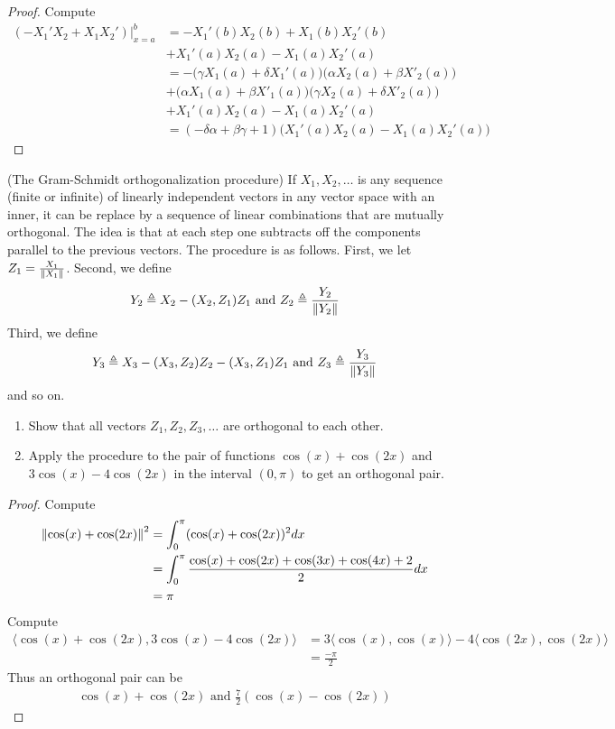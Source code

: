 \documentclass{report}
\begin{document}
\begin{proof}
Compute 
\begin{align*}
(-X_1'X_2+ X_1X_2')\Big|_{x=a}^b&= -X_1'(b)X_2(b)+X_1 (b)X_2'(b) \\
&+X_1'(a)X_2(a)-X_1(a)X_2'(a)\\
&= - \Big(\gamma X_1(a)+\delta X_1'(a) \Big)\Big( \alpha X_2(a) + \beta X'_2(a) \Big)\\
&+ \Big(\alpha X_1(a)+ \beta X'_1(a) \Big) \Big( \gamma X_2(a)+\delta X'_2(a) \Big)\\
&+X_1'(a)X_2(a)-X_1(a)X_2'(a)\\
&= (-\delta \alpha + \beta  \gamma +1)\big(X_1'(a)X_2(a)-X_1(a)X_2'(a)\big)
\end{align*}
\end{proof}
\begin{question}{}{}
  (The Gram-Schmidt orthogonalization procedure) If $X_1,X_2,\dots$ is any sequence (finite or infinite) of linearly independent vectors in any vector space with an inner, it can be replace by a sequence of linear combinations that are mutually orthogonal. The idea is that at each step one subtracts off the components parallel to the previous vectors. The procedure is as follows. First, we let $Z_1 = \frac{X_1}{\left\| X_1 \right\|}$. Second, we define 
\begin{align*}
    Y_2\triangleq X_2 - (X_2,Z_1)Z_1\text{ and }Z_2 \triangleq \frac{Y_2}{\left\| Y_2 \right\|}
\end{align*}
  Third, we define 
\begin{align*}
Y_3 \triangleq X_3 - (X_3,Z_2)Z_2 - (X_3,Z_1)Z_1\text{ and }Z_3\triangleq \frac{Y_3}{\left\| Y_3 \right\|}  
\end{align*}
and so on. 
\begin{enumerate}[label=(\alph*)]
  \item Show that all vectors $Z_1,Z_2,Z_3,\dots$ are orthogonal to each other. 
  \item Apply the procedure to the pair of functions $\cos (x)+\cos (2x)$ and $3 \cos (x)-4 \cos (2x)$ in the interval $(0,\pi )$ to get an orthogonal pair. 
\end{enumerate}
\end{question}
\begin{proof}
Compute 
\begin{align*}
\left\| \cos (x)+ \cos (2x) \right\|^2&=\int_0^{\pi } (\cos (x)+ \cos (2x))^2 dx  \\
&=\int_0^{\pi } \frac{\cos (x)+ \cos (2x)+ \cos (3x)+ \cos (4x)+2}{2} dx \\
&=\pi  
\end{align*}
Compute 
\begin{align*}
\langle \cos (x)+ \cos (2x), 3 \cos (x)-4 \cos (2x)\rangle&= 3\langle \cos(x) ,\cos (x)\rangle  -4\langle \cos (2x),\cos (2x)\rangle  \\
&= \frac{- \pi  }{2}
\end{align*}
Thus an orthogonal pair can be 
\begin{align*}
\cos (x)+ \cos (2x)\text{ and } \frac{7}{2}(\cos (x)-\cos (2x))
\end{align*}
\end{proof}
\end{document}

